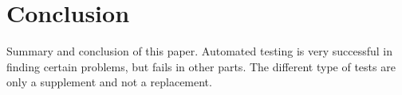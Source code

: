 \section{Conclusion}
Summary and conclusion of this paper. 
Automated testing is very successful in finding certain problems, but fails in other parts.
The different type of tests are only a supplement and not a replacement.